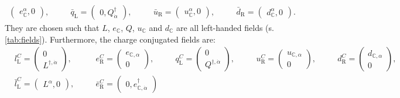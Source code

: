 \begin{itemize}
\begin{equation}
{\begin{alignedat}{5}
\begin{pmatrix}
					e_{\mathbb{C}}^{\alpha}, 0
				\end{pmatrix}, \quad
				&&\bar{q}_{\mathrm{L}} = \begin{pmatrix}
					0, Q^{\dagger}_{\dot{\alpha}}
				\end{pmatrix}, \quad
				&&\bar{u}_{\mathrm{R}} = \begin{pmatrix}
					u_{\mathbb{C}}^{\alpha}, 0
				\end{pmatrix}, \quad
				&&\bar{d}_{\mathrm{R}} = \begin{pmatrix}
					d_{\mathbb{C}}^{\alpha}, 0
				\end{pmatrix}.
			\end{alignedat} \label{eq:quarks}
		}
	\end{equation}
	They are chosen such that $ L $, $ e_{\mathbb{C}} $, $ Q $, $ u_{\mathbb{C}} $ and $ d_{\mathbb{C}} $ are all left-handed fields (s. \cref{tab:fields}).
	Furthermore, the charge conjugated fields are:
	\begin{equation}
		\boxed{
			\begin{alignedat}{5}
				&l_{\mathrm{L}}^{C} = \begin{pmatrix}
					0 \\
					L^{\dagger, \dot{\alpha}}
				\end{pmatrix}, \quad
				&&e_{\mathrm{R}}^{C} = \begin{pmatrix}
					e_{\mathbb{C}, \alpha} \\
					0
				\end{pmatrix}, \quad
				&&q_{\mathrm{L}}^{C} = \begin{pmatrix}
					0 \\
					Q^{\dagger, \dot{\alpha}}
				\end{pmatrix}, \quad
				&&u_{\mathrm{R}}^{C} = \begin{pmatrix}
					u_{\mathbb{C}, \alpha} \\
					0
				\end{pmatrix}, \quad
				&&d_{\mathrm{R}}^{C} = \begin{pmatrix}
					d_{\mathbb{C}, \alpha} \\
					0
				\end{pmatrix}, \\[1.5ex]
				&\bar{l}_{\mathrm{L}}^{C} = \begin{pmatrix}
					L^{\alpha}, 0
				\end{pmatrix}, \quad
				&&\bar{e}_{\mathrm{R}}^{C} = \begin{pmatrix}
					0, e_{\mathbb{C}, \dot{\alpha}}^{\dagger}

\end{pmatrix}
\end{alignedat}}
\end{equation}
\end{itemize}
